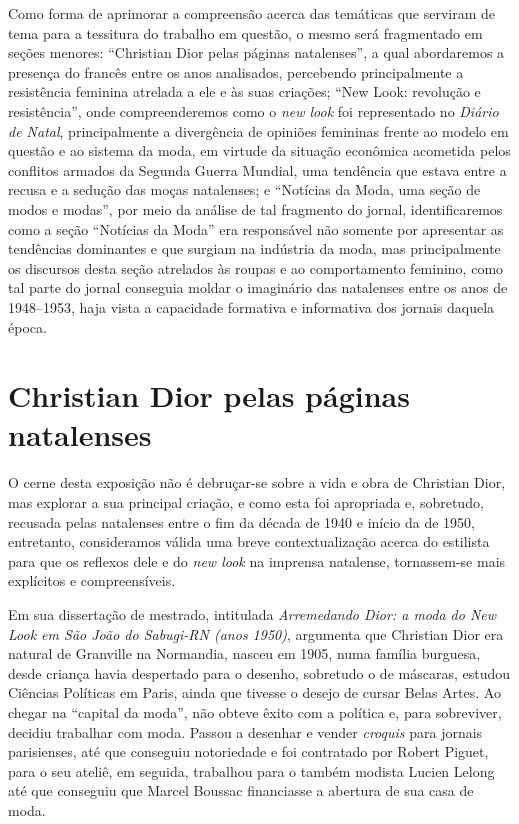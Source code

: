 \begin{refsection}
    Como forma de aprimorar a compreensão acerca das temáticas que serviram de tema para a tessitura do trabalho em questão, o mesmo será fragmentado em seções menores: ``Christian Dior pelas páginas natalenses'', a qual abordaremos a presença do francês entre os anos analisados, percebendo principalmente a resistência feminina atrelada a ele e às suas criações; ``New Look: revolução e resistência'', onde compreenderemos como o \textit{new look} foi representado no \textit{Diário de Natal}, principalmente a divergência de opiniões femininas frente ao modelo em questão e ao sistema da moda, em virtude da situação econômica acometida pelos conflitos armados da Segunda Guerra Mundial, uma tendência que estava entre a recusa e a sedução das moças natalenses; e ``Notícias da Moda, uma seção de modos e modas'', por meio da análise de tal fragmento do jornal, identificaremos como a seção ``Notícias da Moda'' era responsável não somente por apresentar as tendências dominantes e que surgiam na indústria da moda, mas principalmente os discursos desta seção atrelados às roupas e ao comportamento feminino, como tal parte do jornal conseguia moldar o imaginário das natalenses entre os anos de 1948--1953, haja vista a capacidade formativa e informativa dos jornais daquela época.

    \section{Christian Dior pelas páginas natalenses}

    O cerne desta exposição não é debruçar-se sobre a vida e obra de Christian Dior, mas explorar a sua principal criação, e como esta foi apropriada e, sobretudo, recusada pelas natalenses entre o fim da década de 1940 e início da de 1950, entretanto, consideramos válida uma breve contextualização acerca do estilista para que os reflexos dele e do \textit{new look} na imprensa natalense, tornassem-se mais explícitos e compreensíveis.  

    Em sua dissertação de mestrado, intitulada \textit{Arremedando Dior: a moda do New Look em São João do Sabugi-RN (anos 1950)}, \textcite{MedeirosFl2014Arremedando} argumenta que Christian Dior era natural de Granville na Normandia, nasceu em 1905, numa família burguesa, desde criança havia despertado para o desenho, sobretudo o de máscaras, estudou Ciências Políticas em Paris, ainda que tivesse o desejo de cursar Belas Artes. Ao chegar na ``capital da moda'', não obteve êxito com a política e, para sobreviver, decidiu trabalhar com moda. Passou a desenhar e vender \textit{croquis} para jornais parisienses, até que conseguiu notoriedade e foi contratado por Robert Piguet, para o seu ateliê, em seguida, trabalhou para o também modista Lucien Lelong até que conseguiu que Marcel Boussac financiasse a abertura de sua casa de moda.  


\end{refsection}
